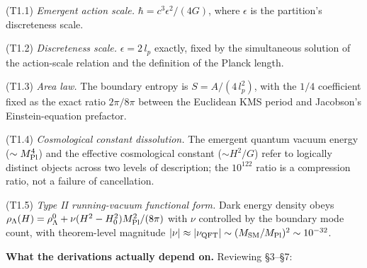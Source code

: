 \documentclass[
]{article}
\begin{document}
(T1.1) \emph{Emergent action scale.} \(\hbar = c^3 \epsilon^2 / (4G)\),
where \(\epsilon\) is the partition's discreteness scale.

(T1.2) \emph{Discreteness scale.} \(\epsilon = 2\,l_p\) exactly, fixed
by the simultaneous solution of the action-scale relation and the
definition of the Planck length.

(T1.3) \emph{Area law.} The boundary entropy is \(S = A/(4\,l_p^2)\),
with the \(1/4\) coefficient fixed as the exact ratio \(2\pi/8\pi\)
between the Euclidean KMS period and Jacobson's Einstein-equation
prefactor.

(T1.4) \emph{Cosmological constant dissolution.} The emergent quantum
vacuum energy (\(\sim M_{\rm Pl}^4\)) and the effective cosmological
constant (\(\sim H^2/G\)) refer to logically distinct objects across two
levels of description; the \(10^{122}\) ratio is a compression ratio,
not a failure of cancellation.

(T1.5) \emph{Type II running-vacuum functional form.} Dark energy
density obeys
\(\rho_\Lambda(H) = \rho_\Lambda^0 + \nu (H^2 - H_0^2) M_{\rm Pl}^2 / (8\pi)\)
with \(\nu\) controlled by the boundary mode count, with theorem-level
magnitude
\(|\nu| \approx |\nu_{\rm QFT}| \sim (M_{\rm SM}/M_{\rm Pl})^2 \sim 10^{-32}\).

\textbf{What the derivations actually depend on.} Reviewing §3--§7:
\end{document}
